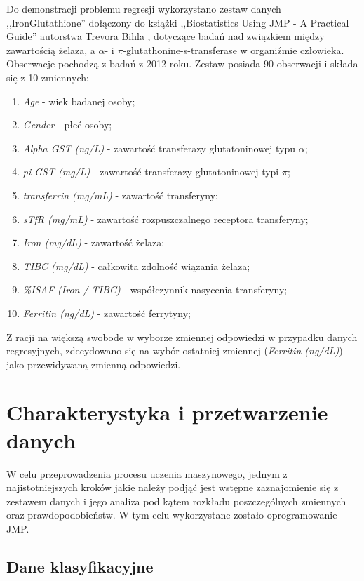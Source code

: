	Do demonstracji problemu regresji wykorzystano zestaw danych ,,IronGlutathione'' dołączony do książki ,,Biostatistics Using JMP - A Practical Guide'' autorstwa Trevora Bihla \cite{biostatisticsJMP}, dotyczące badań nad związkiem między zawartością żelaza, a $\alpha$- i $\pi$-glutathonine-s-transferase w organiźmie człowieka. Obserwacje pochodzą z badań z 2012 roku. Zestaw posiada 90 obserwacji i składa się z 10 zmiennych:
	
	\begin{enumerate}
		\item \textit{Age} - wiek badanej osoby;
		\item \textit{Gender} - płeć osoby;
		\item \textit{Alpha GST (ng/L)} - zawartość transferazy glutatoninowej typu $\alpha$;
		\item \textit{pi GST (mg/L)} - zawartość transferazy glutatoninowej typi $\pi$;
		\item \textit{transferrin (mg/mL)} - zawartość transferyny;
		\item \textit{sTfR (mg/mL)} - zawartość rozpuszczalnego receptora transferyny;
		\item \textit{Iron (mg/dL)} - zawartość żelaza;
		\item \textit{TIBC (mg/dL)} - całkowita zdolność wiązania żelaza;
		\item \textit{\%ISAF (Iron / TIBC)} - współczynnik nasycenia transferyny;
		\item \textit{Ferritin (ng/dL)} - zawartość ferrytyny;
	\end{enumerate} 
	
	Z racji na większą swobode w wyborze zmiennej odpowiedzi w przypadku danych regresyjnych, zdecydowano się na wybór ostatniej zmiennej (\textit{Ferritin (ng/dL)}) jako przewidywaną zmienną odpowiedzi. 
	
\section{Charakterystyka i przetwarzenie danych}

	W celu przeprowadzenia procesu uczenia maszynowego, jednym z najistotniejszych kroków jakie należy podjąć jest wstępne zaznajomienie się z zestawem danych i jego analiza pod kątem rozkładu poszczególnych zmiennych oraz prawdopodobieństw. W tym celu wykorzystane zostało oprogramowanie JMP. 

	\subsection{Dane klasyfikacyjne}
